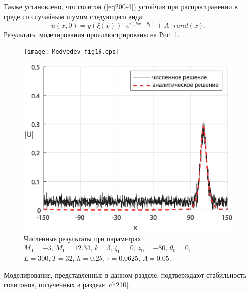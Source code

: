 \documentclass[12pt,a4paper]{article}
\begin{document}
	Также установлено, что солитон (\ref{eq200-4}) устойчив при распространении в среде со случайным шумом следующего вида:
	\begin{equation} \label{eq522}
		u(x,0)=y\left(\xi\left(x\right)\right)\cdot e^{i(kx-\theta_{0})}+A\cdot rand(x).
	\end{equation}
	Результаты моделирования проиллюстрированы на Рис. \ref{fig172}.	
	\begin{figure}[H] %
		\begin{center}
			\begin{minipage}[h]{0.48\linewidth}
				\texttt{[image: Medvedev\_fig16.eps]}
			\end{minipage}
			\hfill
			\begin{minipage}[h]{0.48\linewidth}
				\includegraphics[width=1\linewidth]{Medvedev_fig17.eps}
			\end{minipage}
		\end{center}
		\caption{Численные результаты при параметрах \(M_{0}=-3,\,M_{1}=12.34,\, k=3,\, \xi_{0}=0,\,z_{0}=-80,\, \theta_{0}=0\), \\
		\(L=300,\, T=32,\, h=0.25,\, \tau=0.0625,\,A=0.05\).}
		\label{fig172}
	\end{figure}

	Моделирования, представленные в данном разделе, подтверждают стабильность солитонов, полученных в разделе \ref{ch210}.
\end{document}

